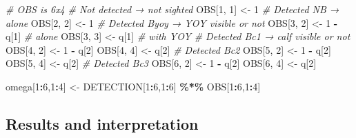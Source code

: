 \documentclass[
  12pt,
]{krantz}
\newenvironment{Shaded}{\begin{snugshade}}{\end{snugshade}}
\newcommand{\CommentTok}[1]{\textcolor[rgb]{0.56,0.35,0.01}{\textit{#1}}}
\newcommand{\DecValTok}[1]{\textcolor[rgb]{0.00,0.00,0.81}{#1}}
\newcommand{\NormalTok}[1]{#1}
\newcommand{\OtherTok}[1]{\textcolor[rgb]{0.56,0.35,0.01}{#1}}
\newcommand{\SpecialCharTok}[1]{\textcolor[rgb]{0.81,0.36,0.00}{\textbf{#1}}}
\begin{document}
\begin{Shaded}
\begin{Highlighting}[]
\CommentTok{\# OBS is 6x4}
\CommentTok{\# Not detected → not sighted}
\NormalTok{OBS[}\DecValTok{1}\NormalTok{, }\DecValTok{1}\NormalTok{] }\OtherTok{\textless{}{-}} \DecValTok{1}
\CommentTok{\# Detected NB → alone}
\NormalTok{OBS[}\DecValTok{2}\NormalTok{, }\DecValTok{2}\NormalTok{] }\OtherTok{\textless{}{-}} \DecValTok{1}
\CommentTok{\# Detected Byoy → YOY visible or not}
\NormalTok{OBS[}\DecValTok{3}\NormalTok{, }\DecValTok{2}\NormalTok{] }\OtherTok{\textless{}{-}} \DecValTok{1} \SpecialCharTok{{-}}\NormalTok{ q[}\DecValTok{1}\NormalTok{]    }\CommentTok{\# alone}
\NormalTok{OBS[}\DecValTok{3}\NormalTok{, }\DecValTok{3}\NormalTok{] }\OtherTok{\textless{}{-}}\NormalTok{ q[}\DecValTok{1}\NormalTok{]        }\CommentTok{\# with YOY}
\CommentTok{\# Detected Bc1 → calf visible or not}
\NormalTok{OBS[}\DecValTok{4}\NormalTok{, }\DecValTok{2}\NormalTok{] }\OtherTok{\textless{}{-}} \DecValTok{1} \SpecialCharTok{{-}}\NormalTok{ q[}\DecValTok{2}\NormalTok{]}
\NormalTok{OBS[}\DecValTok{4}\NormalTok{, }\DecValTok{4}\NormalTok{] }\OtherTok{\textless{}{-}}\NormalTok{ q[}\DecValTok{2}\NormalTok{]}
\CommentTok{\# Detected Bc2}
\NormalTok{OBS[}\DecValTok{5}\NormalTok{, }\DecValTok{2}\NormalTok{] }\OtherTok{\textless{}{-}} \DecValTok{1} \SpecialCharTok{{-}}\NormalTok{ q[}\DecValTok{2}\NormalTok{]}
\NormalTok{OBS[}\DecValTok{5}\NormalTok{, }\DecValTok{4}\NormalTok{] }\OtherTok{\textless{}{-}}\NormalTok{ q[}\DecValTok{2}\NormalTok{]}
\CommentTok{\# Detected Bc3}
\NormalTok{OBS[}\DecValTok{6}\NormalTok{, }\DecValTok{2}\NormalTok{] }\OtherTok{\textless{}{-}} \DecValTok{1} \SpecialCharTok{{-}}\NormalTok{ q[}\DecValTok{2}\NormalTok{]}
\NormalTok{OBS[}\DecValTok{6}\NormalTok{, }\DecValTok{4}\NormalTok{] }\OtherTok{\textless{}{-}}\NormalTok{ q[}\DecValTok{2}\NormalTok{]}

\NormalTok{omega[}\DecValTok{1}\SpecialCharTok{:}\DecValTok{6}\NormalTok{,}\DecValTok{1}\SpecialCharTok{:}\DecValTok{4}\NormalTok{] }\OtherTok{\textless{}{-}}\NormalTok{ DETECTION[}\DecValTok{1}\SpecialCharTok{:}\DecValTok{6}\NormalTok{,}\DecValTok{1}\SpecialCharTok{:}\DecValTok{6}\NormalTok{] }\SpecialCharTok{\%*\%}\NormalTok{ OBS[}\DecValTok{1}\SpecialCharTok{:}\DecValTok{6}\NormalTok{,}\DecValTok{1}\SpecialCharTok{:}\DecValTok{4}\NormalTok{]}
\end{Highlighting}
\end{Shaded}

\subsection{Results and interpretation}\label{results-and-interpretation-7}
\end{document}
